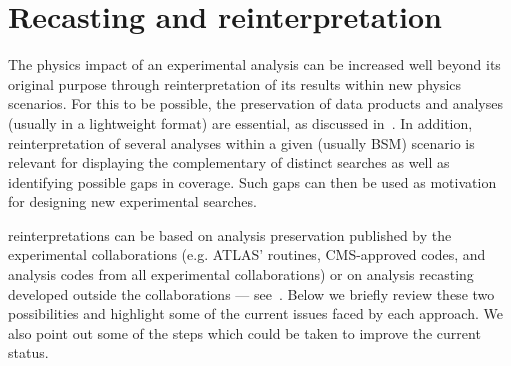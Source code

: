 \documentclass[11pt]{article}
\begin{document}

\section{Recasting and reinterpretation}
\label{reinterpret}

The physics impact of an experimental analysis can be increased well beyond its original purpose through \gls{reinterpretation} of its results within new physics scenarios.
For this to be possible, the preservation of \glspl{data product} and analyses (usually in a lightweight format) are essential, as discussed in~.
In addition, reinterpretation of several analyses within a given (usually \gls{BSM}) scenario is relevant for displaying the complementary of distinct searches as well as identifying possible gaps in coverage.
Such gaps can then be used as motivation for designing new experimental searches.


\Glspl{reinterpretation} can be based on \gls{analysis preservation} published by the experimental collaborations (e.g. ATLAS' \simpleanalysis routines, \gls{CMS}-approved \madanalysis codes, and \rivet analysis codes from all experimental collaborations) or on analysis recasting developed outside the collaborations --- see~. Below we briefly review these two possibilities and highlight some of the current issues faced by each approach.
We also point out some of the steps which could be taken to improve the current status.





\end{document}
